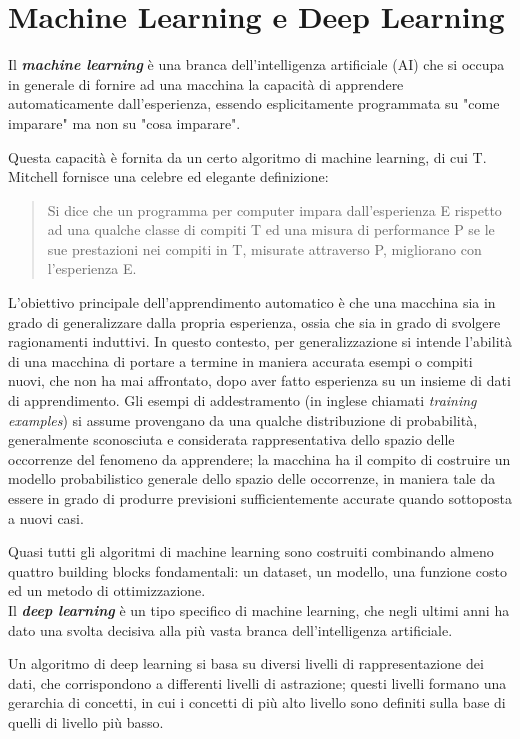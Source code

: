 \section{Machine Learning e Deep Learning}
Il \textbf{\textit{machine learning}} è una branca dell'intelligenza artificiale (AI) che si occupa in generale di fornire ad una macchina la capacità di apprendere automaticamente dall'esperienza, essendo esplicitamente programmata su "come imparare" ma non su "cosa imparare".

Questa capacità è fornita da un certo algoritmo di machine learning, di cui T. Mitchell fornisce una celebre ed elegante definizione:
\begin{quote}
Si dice che un programma per computer impara dall’esperienza E rispetto ad una qualche classe di compiti T ed una misura di performance P se le sue prestazioni nei compiti in T, misurate attraverso P, migliorano con l’esperienza E.
\end{quote}

L'obiettivo principale dell'apprendimento automatico è che una macchina sia in grado di generalizzare dalla propria esperienza\cite{bishop}, ossia che sia in grado di svolgere ragionamenti induttivi. In questo contesto, per generalizzazione si intende l'abilità di una macchina di portare a termine in maniera accurata esempi o compiti nuovi, che non ha mai affrontato, dopo aver fatto esperienza su un insieme di dati di apprendimento.
Gli esempi di addestramento (in inglese chiamati \textit{training examples}) si assume provengano da una qualche distribuzione di probabilità, generalmente sconosciuta e considerata rappresentativa dello spazio delle occorrenze del fenomeno da apprendere; la macchina ha il compito di costruire un modello probabilistico generale dello spazio delle occorrenze, in maniera tale da essere in grado di produrre previsioni sufficientemente accurate quando sottoposta a nuovi casi.

Quasi tutti gli algoritmi di machine learning sono costruiti combinando almeno quattro
building blocks fondamentali: un dataset, un modello, una funzione costo ed un
metodo di ottimizzazione.\\

Il \textbf{\textit{deep learning}} è un tipo specifico di machine learning, che negli ultimi anni ha dato una svolta decisiva alla più vasta branca dell’intelligenza artificiale.

Un algoritmo di deep learning si basa su diversi livelli di rappresentazione dei dati, che corrispondono a differenti livelli di astrazione; questi livelli formano una gerarchia di concetti, in cui i concetti di più alto livello sono definiti sulla base di quelli di livello più basso.

